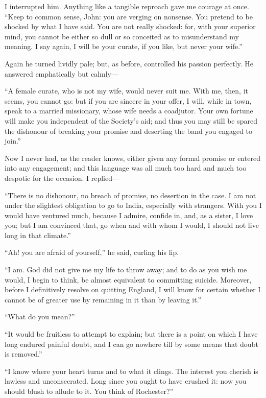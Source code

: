 I interrupted him. Anything like a tangible reproach gave me courage at
once. \enquote{Keep to common sense, \St{} John: you are verging on
nonsense. You pretend to be shocked by what I have said. You are not
really shocked: for, with your superior mind, you cannot be either so
dull or so conceited as to misunderstand my meaning. I say again, I
will be your curate, if you like, but never your wife.}

Again he turned lividly pale; but, as before, controlled his passion
perfectly. He answered emphatically but calmly---

\enquote{A female curate, who is not my wife, would never suit me. With
me, then, it seems, you cannot go: but if you are sincere in your offer,
I will, while in town, speak to a married missionary, whose wife needs a
coadjutor. Your own fortune will make you independent of the Society's
aid; and thus you may still be spared the dishonour of breaking your
promise and deserting the band you engaged to join.}

Now I never had, as the reader knows, either given any formal promise or
entered into any engagement; and this language was all much too hard and
much too despotic for the occasion. I replied---

\enquote{There is no dishonour, no breach of promise, no desertion in
the case. I am not under the slightest obligation to go to India,
especially with strangers. With you I would have ventured much, because
I admire, confide in, and, as a sister, I love you; but I am convinced
that, go when and with whom I would, I should not live long in that
climate.}

\enquote{Ah! you are afraid of yourself,} he said, curling his lip.

\enquote{I am. God did not give me my life to throw away; and to do as
you wish me would, I begin to think, be almost equivalent to committing
suicide. Moreover, before I definitively resolve on quitting England, I
will know for certain whether I cannot be of greater use by remaining in
it than by leaving it.}

\enquote{What do you mean?}

\enquote{It would be fruitless to attempt to explain; but there is a
point on which I have long endured painful doubt, and I can go nowhere
till by some means that doubt is removed.}

\enquote{I know where your heart turns and to what it clings. The
interest you cherish is lawless and unconsecrated. Long since you ought
to have crushed it: now you should blush to allude to it. You think of
\Mr{} Rochester?}

